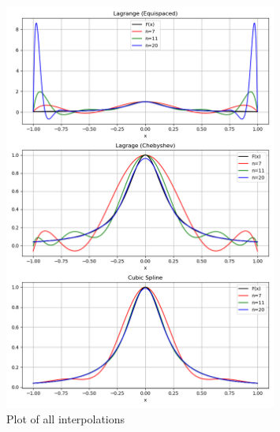 \documentclass{amsart}
\begin{document}
    \begin{figure}[h]
        \centering
        \includegraphics[width=0.8\textwidth]{multi-interpolant.png}
        \caption{Plot of all interpolations}
        \label{fig:multiple_function}
    \end{figure}
    \clearpage
\end{document}
